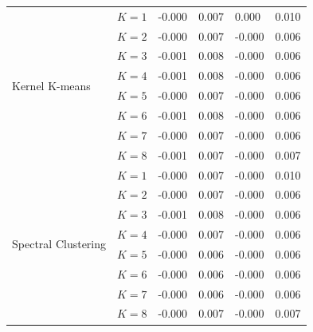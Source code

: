 \begin{table}[!t]
\begin{tabular}{l|c|ll|ll}
    \midrule
    \multirow[t]{8}{*}{Kernel K-means} 
      & $K=1$ & -0.000 & 0.007 &  0.000 & 0.010 \\
      & $K=2$ & -0.000 & 0.007 & -0.000 & 0.006 \\
      & $K=3$ & -0.001 & 0.008 & -0.000 & 0.006 \\
      & $K=4$ & -0.001 & 0.008 & -0.000 & 0.006 \\
      & $K=5$ & -0.000 & 0.007 & -0.000 & 0.006 \\
      & $K=6$ & -0.001 & 0.008 & -0.000 & 0.006 \\
      & $K=7$ & -0.000 & 0.007 & -0.000 & 0.006 \\
      & $K=8$ & -0.001 & 0.007 & -0.000 & 0.007 \\
    \midrule
    \multirow[t]{8}{*}{Spectral Clustering} 
      & $K=1$ & -0.000 & 0.007 & -0.000 & 0.010 \\
      & $K=2$ & -0.000 & 0.007 & -0.000 & 0.006 \\
      & $K=3$ & -0.001 & 0.008 & -0.000 & 0.006 \\
      & $K=4$ & -0.000 & 0.007 & -0.000 & 0.006 \\
      & $K=5$ & -0.000 & 0.006 & -0.000 & 0.006 \\
      & $K=6$ & -0.000 & 0.006 & -0.000 & 0.006 \\
      & $K=7$ & -0.000 & 0.006 & -0.000 & 0.006 \\
      & $K=8$ & -0.000 & 0.007 & -0.000 & 0.007 \\
    \midrule
    \end{tabular}
\end{table}

